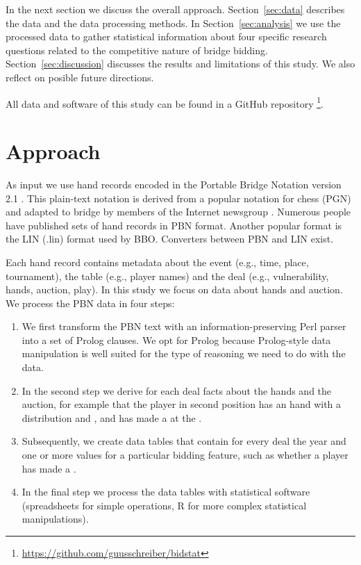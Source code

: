 \documentclass{icga}
\renewcommand{\secref}[1]{Section~\ref{sec:#1}}
\begin{document}
In the next section we discuss the overall approach. \secref{data}
describes the data and the data processing methods.  In
\secref{analysis} we use the processed data to gather statistical
information about four specific research questions related to the
competitive nature of bridge bidding.  \secref{discussion} discusses
the results and limitations of this study. We also reflect on posible
future directions.
   
All data and software of this study can be found in a GitHub
repository%
\footnote{\url{https://github.com/guusschreiber/bidstat}}.


\section{Approach}
\label{sec:approach}

As input we use hand records encoded in the Portable Bridge
Notation version 2.1 . This plain-text notation is derived
from a popular notation for chess (PGN) and adapted to bridge by
members of the Internet newsgroup
. Numerous people have published sets of
hand records in PBN format. Another popular format is the LIN (.lin)
format used by BBO. Converters between PBN and LIN exist.

Each hand record contains metadata about the event (e.g., time, place,
tournament), the table (e.g., player names) and the deal (e.g.,
vulnerability, hands, auction, play).  In this study we focus on data
about hands and auction. We process the PBN data in four steps:

\begin{enumerate}
\item We first transform the PBN text with an information-preserving
  Perl parser into a set of Prolog clauses. We opt for Prolog because
  Prolog-style data manipulation is well suited for the type of
  reasoning we need to do with the data.
\item In the second step we derive for each deal facts about
  the hands and the auction, for example that the player in second
  position has an  hand with a 
  distribution and , and has made a 
  at the .
\item Subsequently, we create data tables that contain for every deal
  the year and one or more values for a particular bidding feature,
  such as whether a player has made a .
\item In the final step we process the data tables with statistical
  software (spreadsheets for simple operations, R for more complex
  statistical manipulations).
\end{enumerate}
\end{document}
